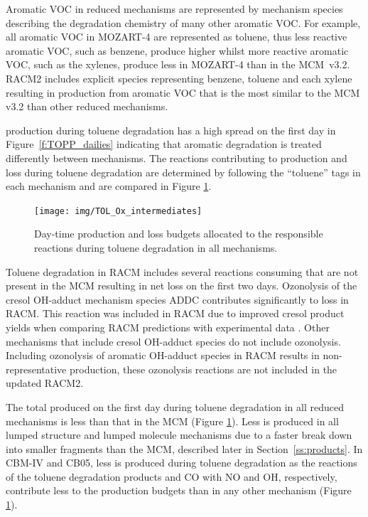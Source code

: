 Aromatic VOC in reduced mechanisms are represented by mechanism species describing the degradation chemistry of many other aromatic VOC.
For example, all aromatic VOC in MOZART-4 are represented as toluene, thus less reactive aromatic VOC, such as benzene, produce higher  whilst more reactive aromatic VOC, such as the xylenes, produce less  in MOZART-4 than in the \mbox{MCM v3.2}.
RACM2 includes explicit species representing benzene, toluene and each xylene resulting in  production from aromatic VOC that is the most similar to the MCM v3.2 than other reduced mechanisms.

 production during toluene degradation has a high spread on the first day in \mbox{Figure \ref{f:TOPP_dailies}} indicating that aromatic degradation is treated differently between mechanisms.
The reactions contributing to  production and loss during toluene degradation are determined by following the ``toluene'' tags in each mechanism and are compared in Figure \ref{f:toluene_Ox}.
%
\begin{figure}
    \centering
    \texttt{[image: img/TOL\_Ox\_intermediates]}
    \vspace{0mm}
    \caption{Day-time  production and loss budgets allocated to the responsible reactions during toluene degradation in all mechanisms.}
    \vspace{-4mm}
    \label{f:toluene_Ox}
\end{figure}
%
Toluene degradation in RACM includes several reactions consuming  that are not present in the MCM resulting in net  loss on the first two days.
Ozonolysis of the cresol OH-adduct mechanism species ADDC contributes significantly to  loss in RACM.
This reaction was included in RACM due to improved cresol product yields when comparing RACM predictions with experimental data \citep{Stockwell:1997}. 
Other mechanisms that include cresol OH-adduct species do not include ozonolysis.
Including ozonolysis of aromatic OH-adduct species in RACM results in non-representative  production, these ozonolysis reactions are not included in the updated RACM2.

The total  produced on the first day during toluene degradation in all reduced mechanisms is less than that in the MCM (Figure \ref{f:toluene_Ox}).
Less  is produced in all lumped structure and lumped molecule mechanisms due to a faster break down into smaller fragments than the MCM, described later in \mbox{Section \ref{ss:products}}.
In CBM-IV and CB05, less  is produced during toluene degradation as the reactions of the toluene degradation products  and CO with NO and OH, respectively, contribute less to the  production budgets than in any other mechanism (Figure \ref{f:toluene_Ox}).

